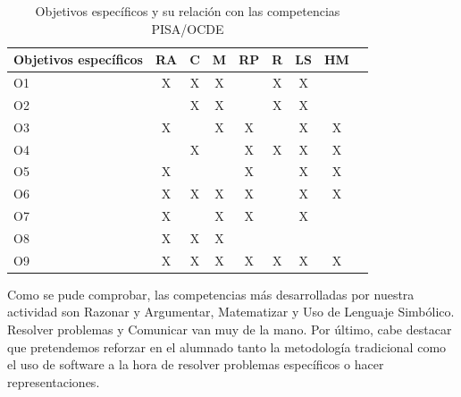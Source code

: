 \documentclass[../main.tex]{memoir}
\begin{document}
\begin{table}[H]
	\centering
	\begin{tabular}{lcccccccc}
		\hline
		\toprule
		\textbf{Objetivos específicos} & \textbf{RA} & \textbf{C} & \textbf{M} & \textbf{RP} & \textbf{R} & \textbf{LS} & \textbf{HM} \\ 
		\midrule
		O1                             & X           & X          & X          &             & X          & X           &             \\ \hline
		O2                             &             & X          & X          &             & X          & X           &             \\ \hline
		O3                             & X           &            & X          & X           &            & X           & X           \\ \hline
		O4                             &             & X          &           & X           & X          & X           & X           \\ \hline
		O5                             & X           &            &          & X           &            & X           & X           \\ \hline
		O6                             & X           & X          & X          & X           &            & X           & X           \\ \hline
		O7                             & X           &            & X          & X           &            & X           &             \\ \hline
		O8                             & X           & X          & X          &             &            &             &             \\ \hline
		O9                             & X           & X          & X          & X           & X          & X           & X           \\ 
		\bottomrule
	\end{tabular}
	\caption{Objetivos específicos y su relación con las competencias PISA/OCDE}
	\label{tab:obj-pisa}
\end{table}

Como se pude comprobar, las competencias más desarrolladas por nuestra actividad son Razonar y Argumentar, Matematizar y Uso de Lenguaje Simbólico. Resolver problemas y Comunicar van muy de la mano. Por último, cabe destacar que pretendemos reforzar en el alumnado tanto la metodología tradicional como el uso de software a la hora de resolver problemas específicos o hacer representaciones.
\end{document}
